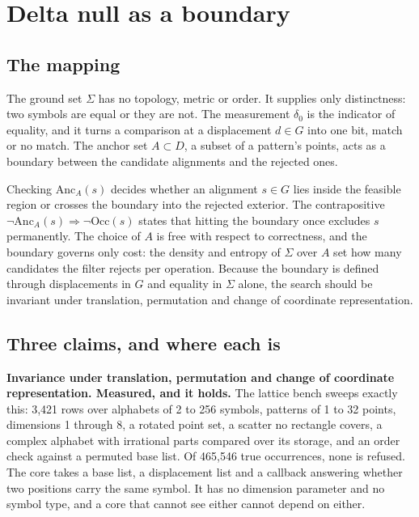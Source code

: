 \chapter{Delta null as a boundary}

\section{The mapping}

The ground set \(\Sigma\) has no topology, metric or order. It supplies only distinctness: two symbols
are equal or they are not. The measurement \(\delta_0\) is the indicator of equality, and it turns a
comparison at a displacement \(d \in G\) into one bit, match or no match. The anchor set
\(A \subset D\), a subset of a pattern's points, acts as a boundary between the candidate alignments
and the rejected ones.

Checking \(\mathrm{Anc}_A(s)\) decides whether an alignment \(s \in G\) lies inside the feasible region
or crosses the boundary into the rejected exterior. The contrapositive
\(\neg\mathrm{Anc}_A(s) \Rightarrow \neg\mathrm{Occ}(s)\) states that hitting the boundary once excludes
\(s\) permanently. The choice of \(A\) is free with respect to correctness, and the boundary governs
only cost: the density and entropy of \(\Sigma\) over \(A\) set how many candidates the filter rejects
per operation. Because the boundary is defined through displacements in \(G\) and equality in
\(\Sigma\) alone, the search should be invariant under translation, permutation and change of
coordinate representation.

\section{Three claims, and where each is}

\textbf{Invariance under translation, permutation and change of coordinate representation. Measured,
and it holds.} The lattice bench sweeps exactly this: 3{,}421 rows over alphabets of 2 to 256 symbols,
patterns of 1 to 32 points, dimensions 1 through 8, a rotated point set, a scatter no rectangle covers,
a complex alphabet with irrational parts compared over its storage, and an order check against a
permuted base list. Of 465{,}546 true occurrences, none is refused. The core takes a base list, a
displacement list and a callback answering whether two positions carry the same symbol. It has no
dimension parameter and no symbol type, and a core that cannot see either cannot depend on either.

